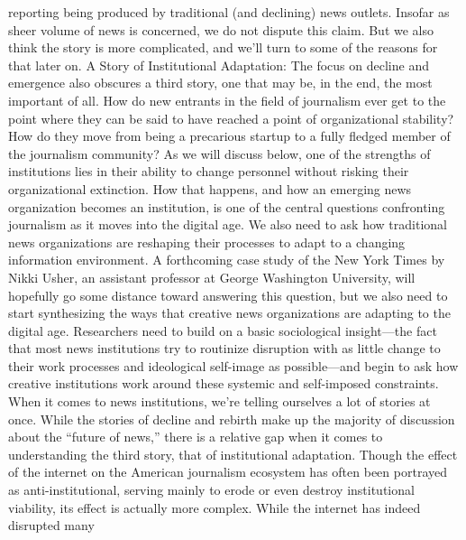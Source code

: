 reporting being produced by traditional (and declining) news outlets.
Insofar as sheer volume of news is concerned, we do not dispute this
claim. But we also think the story is more complicated, and we’ll turn
to some of the reasons for that later on.
A Story of Institutional Adaptation: The focus on decline and emergence
also obscures a third story, one that may be, in the end, the most important
of all. How do new entrants in the field of journalism ever get to
the point where they can be said to have reached a point of organizational
stability? How do they move from being a precarious startup to a
fully fledged member of the journalism community? As we will discuss
below, one of the strengths of institutions lies in their ability to change
personnel without risking their organizational extinction. How that
happens, and how an emerging news organization becomes an institution,
is one of the central questions confronting journalism as it moves
into the digital age.
We also need to ask how traditional news organizations are reshaping
their processes to adapt to a changing information environment.
A forthcoming case study of the New York Times by Nikki Usher,
an assistant professor at George Washington University, will hopefully
go some distance toward answering this question, but we also need to
start synthesizing the ways that creative news organizations are adapting
to the digital age. Researchers need to build on a basic sociological
insight—the fact that most news institutions try to routinize disruption
with as little change to their work processes and ideological self-image
as possible—and begin to ask how creative institutions work around
these systemic and self-imposed constraints.
When it comes to news institutions, we’re telling ourselves a lot of stories at
once. While the stories of decline and rebirth make up the majority of discussion
about the ``future of news,'' there is a relative gap when it comes to understanding
the third story, that of institutional adaptation. Though the effect of
the internet on the American journalism ecosystem has often been portrayed as
anti-institutional, serving mainly to erode or even destroy institutional viability,
its effect is actually more complex. While the internet has indeed disrupted many

